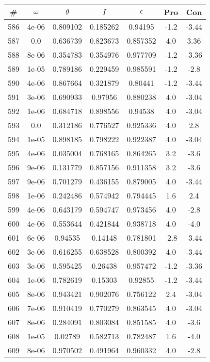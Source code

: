\begin{table}
\begin{tabular}{c|c|c|c|c|c|c}
\# & $\omega$ & $\theta$ & $I$ & $\epsilon$ & Pro & Con\\
\hline
586 & 4e-06 & 0.809102 & 0.185262 & 0.94195 & -1.2 & -3.44\\
587 & 0.0 & 0.636739 & 0.823673 & 0.857352 & 4.0 & 3.36\\
588 & 8e-06 & 0.354783 & 0.354976 & 0.977709 & -1.2 & -3.36\\
589 & 1e-05 & 0.789186 & 0.229459 & 0.985591 & -1.2 & -2.8\\
590 & 4e-06 & 0.867664 & 0.321879 & 0.80441 & -1.2 & -3.44\\
591 & 3e-06 & 0.690933 & 0.97956 & 0.880238 & 4.0 & -3.04\\
592 & 1e-06 & 0.684718 & 0.898556 & 0.94538 & 4.0 & -3.04\\
593 & 0.0 & 0.312186 & 0.776527 & 0.925336 & 4.0 & 2.8\\
594 & 1e-05 & 0.898185 & 0.798222 & 0.922387 & 4.0 & -3.04\\
595 & 4e-06 & 0.035004 & 0.768165 & 0.864265 & 3.2 & -3.6\\
596 & 9e-06 & 0.131779 & 0.857156 & 0.911358 & 3.2 & -3.6\\
597 & 9e-06 & 0.701279 & 0.436155 & 0.879005 & 4.0 & -3.44\\
598 & 1e-06 & 0.242486 & 0.574942 & 0.794445 & 1.6 & 2.4\\
599 & 4e-06 & 0.643179 & 0.594747 & 0.973456 & 4.0 & -2.8\\
600 & 4e-06 & 0.553644 & 0.421844 & 0.938718 & 4.0 & -4.0\\
601 & 6e-06 & 0.94535 & 0.14148 & 0.781801 & -2.8 & -3.44\\
602 & 3e-06 & 0.616255 & 0.638528 & 0.800392 & 4.0 & -3.44\\
603 & 3e-06 & 0.595425 & 0.26438 & 0.957472 & -1.2 & -3.36\\
604 & 1e-06 & 0.782619 & 0.15303 & 0.92855 & -1.2 & -3.44\\
605 & 8e-06 & 0.943421 & 0.902076 & 0.756122 & 2.4 & -3.04\\
606 & 7e-06 & 0.910419 & 0.770279 & 0.863545 & 4.0 & -3.04\\
607 & 8e-06 & 0.284091 & 0.803084 & 0.851585 & 4.0 & -3.6\\
608 & 1e-05 & 0.02789 & 0.582713 & 0.782487 & 1.6 & -4.0\\
609 & 8e-06 & 0.970502 & 0.491964 & 0.960332 & 4.0 & -2.8\\

\end{tabular}
\end{table}
